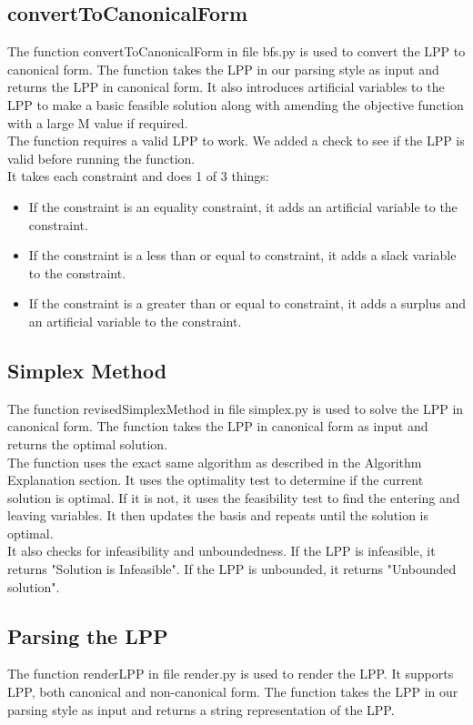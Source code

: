 \documentclass{article}
\numberwithin{equation}{section}
\begin{document}
\subsection{convertToCanonicalForm}
The function convertToCanonicalForm in file bfs.py is used to convert the LPP to canonical form. The function takes the LPP in our parsing style as input and returns the LPP in canonical form. It also introduces artificial variables to the LPP to make a basic feasible solution along with amending the objective function with a large M value if required.\\
The function requires a valid LPP to work. We added a check to see if the LPP is valid before running the function.\\
It takes each constraint and does 1 of 3 things:
\begin{itemize}
    \item If the constraint is an equality constraint, it adds an artificial variable to the constraint.
    \item If the constraint is a less than or equal to constraint, it adds a slack variable to the constraint.
    \item If the constraint is a greater than or equal to constraint, it adds a surplus and an artificial variable to the constraint.
\end{itemize}

\subsection{Simplex Method}
The function revisedSimplexMethod in file simplex.py is used to solve the LPP in canonical form. The function takes the LPP in canonical form as input and returns the optimal solution.\\ 
The function uses the exact same algorithm as described in the Algorithm Explanation section. It uses the optimality test to determine if the current solution is optimal. If it is not, it uses the feasibility test to find the entering and leaving variables. It then updates the basis and repeats until the solution is optimal.\\
It also checks for infeasibility and unboundedness. If the LPP is infeasible, it returns "Solution is Infeasible". If the LPP is unbounded, it returns "Unbounded solution".

\subsection{Parsing the LPP}
The function renderLPP in file render.py is used to render the LPP. It supports LPP, both canonical and non-canonical form. The function takes the LPP in our parsing style as input and returns a string representation of the LPP.
\end{document}
